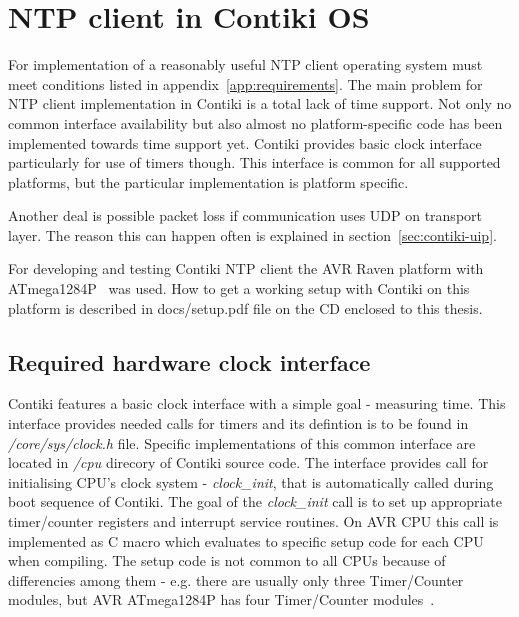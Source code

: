 
\chapter{NTP client in Contiki OS}

For implementation of a reasonably useful NTP client
operating system must meet conditions listed in appendix~\ref{app:requirements}.
The main problem for NTP client implementation in Contiki is a total
lack of time support.
Not only no common interface availability but also
almost no platform-specific code has been implemented towards time support yet.
Contiki provides basic clock interface particularly for use of timers though.
This interface is common for all supported platforms,
but the particular implementation is platform specific.

Another deal is possible packet loss if communication uses UDP on transport layer.
The reason this can happen often is explained in section~\ref{sec:contiki-uip}.

For developing and testing Contiki NTP client the AVR Raven platform with ATmega1284P~\cite{avr-datasheet} was used.
How to get a working setup with Contiki on this platform is described in
docs/setup.pdf file on the CD enclosed to this thesis.

\section{Required hardware clock interface}
Contiki features a basic clock interface with a simple goal - measuring time.
This interface provides needed calls for timers and its defintion is to be found in {\it{/core/sys/clock.h}} file.
Specific implementations of this common interface are located in {\it{/cpu}} direcory of Contiki source code.
The interface provides call for initialising CPU's clock system - {\it{clock\_init}}, that is automatically called during
boot sequence of Contiki.
The goal of the {\it{clock\_init}} call is to set up
appropriate timer/counter registers and interrupt service routines.
On AVR CPU this call is implemented as C macro which evaluates to specific setup code for each CPU
when compiling.
The setup code is not common to all CPUs because of differencies among them - e.g. there are usually
only three Timer/Counter modules, but AVR ATmega1284P has four Timer/Counter modules~\cite{avr-datasheet}.

